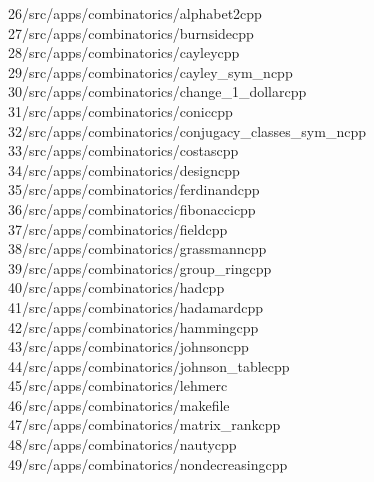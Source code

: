 \begin{tabbing}
26\>/src/apps/combinatorics/alphabet2cpp\\[0pt]
27\>/src/apps/combinatorics/burnsidecpp\\[0pt]
28\>/src/apps/combinatorics/cayleycpp\\[0pt]
29\>/src/apps/combinatorics/cayley\_sym\_ncpp\\[0pt]
30\>/src/apps/combinatorics/change\_1\_dollarcpp\\[0pt]
31\>/src/apps/combinatorics/coniccpp\\[0pt]
32\>/src/apps/combinatorics/conjugacy\_classes\_sym\_ncpp\\[0pt]
33\>/src/apps/combinatorics/costascpp\\[0pt]
34\>/src/apps/combinatorics/designcpp\\[0pt]
35\>/src/apps/combinatorics/ferdinandcpp\\[0pt]
36\>/src/apps/combinatorics/fibonaccicpp\\[0pt]
37\>/src/apps/combinatorics/fieldcpp\\[0pt]
38\>/src/apps/combinatorics/grassmanncpp\\[0pt]
39\>/src/apps/combinatorics/group\_ringcpp\\[0pt]
40\>/src/apps/combinatorics/hadcpp\\[0pt]
41\>/src/apps/combinatorics/hadamardcpp\\[0pt]
42\>/src/apps/combinatorics/hammingcpp\\[0pt]
43\>/src/apps/combinatorics/johnsoncpp\\[0pt]
44\>/src/apps/combinatorics/johnson\_tablecpp\\[0pt]
45\>/src/apps/combinatorics/lehmerc\\[0pt]
46\>/src/apps/combinatorics/makefile\\[0pt]
47\>/src/apps/combinatorics/matrix\_rankcpp\\[0pt]
48\>/src/apps/combinatorics/nautycpp\\[0pt]
49\>/src/apps/combinatorics/nondecreasingcpp\\[0pt]

\end{tabbing}
